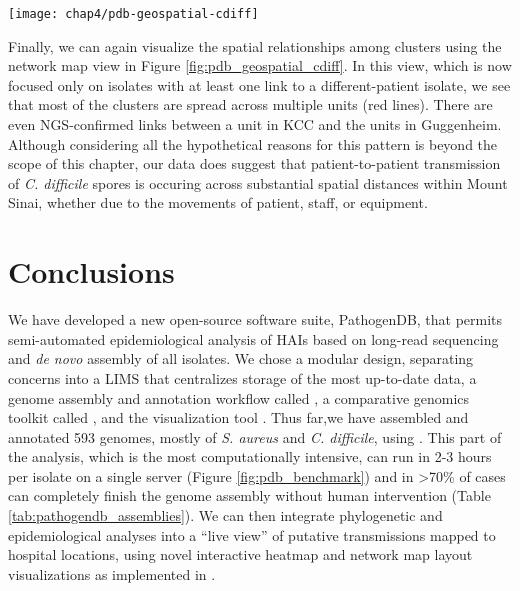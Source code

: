 \begin{sidewaysfigure}[hp]
  \sidewaysvspace
  \centering
  \texttt{[image: chap4/pdb-geospatial-cdiff]}               
\end{sidewaysfigure}

Finally, we can again visualize the spatial relationships among clusters using the network map view in Figure \ref{fig:pdb_geospatial_cdiff}. In this view, which is now focused only on isolates with at least one link to a different-patient isolate, we see that most of the clusters are spread across multiple units (red lines). There are even  NGS-confirmed links between a unit in KCC and the units in Guggenheim. Although considering all the hypothetical reasons for this pattern is beyond the scope of this chapter, our data does suggest that patient-to-patient transmission of \emph{C. difficile} spores is occuring across substantial spatial distances within Mount Sinai, whether due to the movements of patient, staff, or equipment.

\section{Conclusions}

We have developed a new open-source software suite, PathogenDB, that permits semi-automated epidemiological analysis of HAIs based on long-read sequencing and \emph{de novo} assembly of all isolates. We chose a modular design, separating concerns into a LIMS that centralizes storage of the most up-to-date data, a genome assembly and annotation workflow called \pathogendbpipeline, a comparative genomics toolkit called \pathogendbcomparison, and the visualization tool \pathogendbviz. Thus far,we have assembled and annotated 593 genomes, mostly of \emph{S. aureus} and \emph{C. difficile}, using \pathogendbpipeline{}. This part of the analysis, which is the most computationally intensive, can run in 2-3 hours per isolate on a single server (Figure \ref{fig:pdb_benchmark}) and in >70\% of cases can completely finish the genome assembly without human intervention (Table \ref{tab:pathogendb_assemblies}). We can then integrate phylogenetic and epidemiological analyses into a ``live view'' of putative transmissions mapped to hospital locations, using novel interactive heatmap and network map layout visualizations as implemented in \pathogendbviz.

